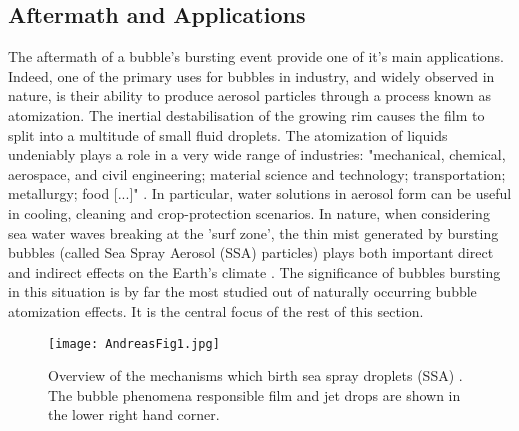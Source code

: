 \documentclass[a4paper,12pt]{article}
\numberwithin{equation}{section}
\numberwithin{figure}{section}
\numberwithin{table}{section}
\begin{document}
\subsection{Aftermath and Applications}

The aftermath of a bubble's bursting event provide one of it's main applications. Indeed, one of the primary uses for bubbles in industry, and widely observed in nature, is their ability to produce aerosol particles through a process known as atomization. The inertial destabilisation of the growing rim causes the film to split into a multitude of small fluid droplets. The atomization of liquids undeniably plays a role in a very wide range of industries: "mechanical, chemical, aerospace, and civil engineering; material science and technology; transportation; metallurgy; food [...]" \cite{Bayvel1993}. In particular, water solutions in aerosol form can be useful in cooling, cleaning and crop-protection scenarios. In nature, when considering sea water waves breaking at the 'surf zone', the thin mist generated by bursting bubbles (called Sea Spray Aerosol (SSA) particles) plays both important direct and indirect effects on the Earth's climate \cite{Lhuissier2011, Modini2013, Andreas1995, Wang2017}. The significance of bubbles bursting in this situation is by far the most studied out of naturally occurring bubble atomization effects. It is the central focus of the rest of this section.

\begin{figure}[!htbp]
    \centering
    \captionsetup{width=.9\linewidth}
    \texttt{[image: AndreasFig1.jpg]}
    \caption{Overview of the mechanisms which birth sea spray droplets (SSA) \cite{Andreas1995}. The bubble phenomena responsible film and jet drops are shown in the lower right hand corner.}
    \label{fig:Andreas1}
\end{figure}
\end{document}
